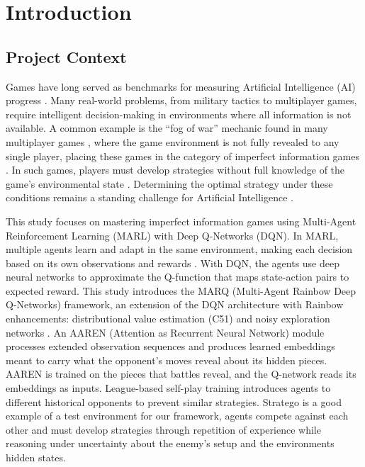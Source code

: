 \chapter{Introduction}
\section{Project Context}
Games have long served as benchmarks for measuring Artificial Intelligence (AI) progress \cite{StudeGame}. Many real-world problems, from military tactics to multiplayer games, require intelligent decision-making in environments where all information is not available. A common example is the ``fog of war'' mechanic found in many multiplayer games \cite{FogofWar}, where the game environment is not fully revealed to any single player, placing these games in the category of imperfect information games \cite{DRLImperfectInfo2023}. In such games, players must develop strategies without full knowledge of the game's environmental state \cite{FogofWar}. Determining the optimal strategy under these conditions remains a standing challenge for Artificial Intelligence \cite{li2024opponent}.

This study focuses on mastering imperfect information games using Multi-Agent Reinforcement Learning (MARL) with Deep Q-Networks (DQN). In MARL, multiple agents learn and adapt in the same environment, making each decision based on its own observations and rewards \cite{2509_03682v1}. With DQN, the agents use deep neural networks to approximate the Q-function that maps state-action pairs to expected reward. This study introduces the MARQ (Multi-Agent Rainbow Deep Q-Networks) framework, an extension of the DQN architecture with Rainbow enhancements: distributional value estimation (C51) and noisy exploration networks \cite{RainbowJMLR2021}. An AAREN (Attention as Recurrent Neural Network) module \cite{Aaren} processes extended observation sequences and produces learned embeddings meant to carry what the opponent's moves reveal about its hidden pieces. AAREN is trained on the pieces that battles reveal, and the Q-network reads its embeddings as inputs. League-based self-play training \cite{perolat2022stratego} introduces agents to different historical opponents to prevent similar strategies. Stratego is a good example of a test environment for our framework, agents compete against each other and must develop strategies through repetition of experience while reasoning under uncertainty about the enemy's setup and the environments hidden states.



